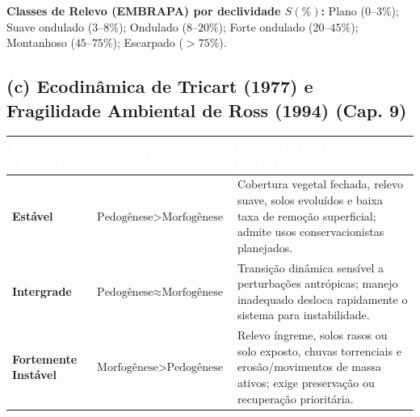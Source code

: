 \noindent\textbf{Classes de Relevo (EMBRAPA) por declividade $S(\%)$:} Plano ($0$--$3\%$); Suave ondulado ($3$--$8\%$); Ondulado ($8$--$20\%$); Forte ondulado ($20$--$45\%$); Montanhoso ($45$--$75\%$); Escarpado ($> 75\%$).

\subsection*{(c) Ecodinâmica de Tricart (1977) e Fragilidade Ambiental de Ross (1994) (Cap. 9)}

\begin{center}
\renewcommand{\arraystretch}{1.22}
\small
\begin{tabularx}{\textwidth}{@{}p{2.9cm} p{3.6cm} >{\raggedright\arraybackslash}X@{}}
  \toprule
  \rowcolor{uefsNavy}
  \textcolor{white}{\bfseries Meio (Tricart)} & \textcolor{white}{\bfseries Balanço Dominante} & \textcolor{white}{\bfseries Características e Implicações para o Uso} \\
  \midrule
  \textbf{Estável} & $\text{Pedogênese} > \text{Morfogênese}$ & Cobertura vegetal fechada, relevo suave, solos evoluídos e baixa taxa de remoção superficial; admite usos conservacionistas planejados. \\
  \rowcolor{bgGray}
  \textbf{Intergrade} & $\text{Pedogênese} \approx \text{Morfogênese}$ & Transição dinâmica sensível a perturbações antrópicas; manejo inadequado desloca rapidamente o sistema para instabilidade. \\
  \textbf{Fortemente Instável} & $\text{Morfogênese} > \text{Pedogênese}$ & Relevo íngreme, solos rasos ou solo exposto, chuvas torrenciais e erosão/movimentos de massa ativos; exige preservação ou recuperação prioritária. \\
  \bottomrule
\end{tabularx}
\end{center}


